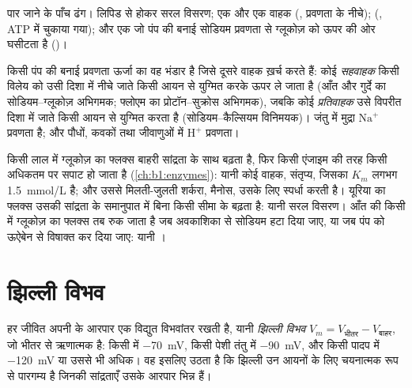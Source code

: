 \begin{omfigure}
{\small पार जाने के पाँच ढंग। लिपिड से होकर सरल विसरण; एक  और एक
वाहक (, प्रवणता के नीचे);  (, ATP में चुकाया गया); और एक  जो पंप की बनाई सोडियम
प्रवणता से ग्लूकोज़ को ऊपर की ओर घसीटता है ()।}
\end{omfigure}

\begin{proposition}[द्वितीयक सक्रिय अभिगमन]\label{prop:b1:membranes-transport:secondary}
किसी पंप की बनाई प्रवणता ऊर्जा का वह भंडार है जिसे दूसरे वाहक ख़र्च करते
हैं: कोई \emph{सहवाहक} किसी विलेय को उसी दिशा में नीचे
जाते किसी आयन से युग्मित करके ऊपर ले जाता है (आँत और गुर्दे का
सोडियम--ग्लूकोज़ अभिगमक; फ्लोएम का प्रोटॉन--सुक्रोस अभिगमक), जबकि कोई
\emph{प्रतिवाहक} उसे विपरीत दिशा में जाते किसी आयन से
युग्मित करता है (सोडियम--कैल्सियम विनिमयक)। जंतु  में मुद्रा
$\mathrm{Na^+}$ प्रवणता है; और पौधों, कवकों तथा जीवाणुओं में
$\mathrm{H^+}$ प्रवणता।
\end{proposition}

\begin{example}[बलगतिकी क्रियाविधि बता देती है]\label{ex:b1:membranes-transport:kinetics}
किसी लाल  में ग्लूकोज़ का फ्लक्स बाहरी सांद्रता के साथ बढ़ता है,
फिर किसी एंजाइम की तरह किसी अधिकतम पर सपाट हो जाता है
(\cref{ch:b1:enzymes}): यानी कोई वाहक, संतृप्य, जिसका $K_m$ लगभग
\qty{1.5}{mmol/L} है; और उससे मिलती-जुलती शर्करा, मैनोस, उसके लिए
स्पर्धा करती है। यूरिया का फ्लक्स उसकी सांद्रता के समानुपात में बिना
किसी सीमा के बढ़ता है: यानी सरल विसरण। आँत की किसी  में ग्लूकोज़
का फ्लक्स तब रुक जाता है जब अवकाशिका से सोडियम हटा दिया जाए, या जब पंप
को ऊऐबेन से विषाक्त कर दिया जाए: यानी ।
\end{example}

\section{झिल्ली विभव}

\begin{definition}[झिल्ली विभव]\label{def:b1:membranes-transport:potential}
हर जीवित  अपनी  के आरपार एक विद्युत विभवांतर रखती
है, यानी \emph{झिल्ली विभव} $V_m = V_{\text{भीतर}} - V_{\text{बाहर}}$, जो भीतर से ऋणात्मक है:
किसी  में \qty{-70}{mV}, किसी पेशी तंतु में \qty{-90}{mV}, और
किसी पादप  में \qty{-120}{mV} या उससे भी अधिक। वह इसलिए उठता है कि
झिल्ली उन आयनों के लिए चयनात्मक रूप से पारगम्य है जिनकी सांद्रताएँ उसके
आरपार भिन्न हैं।
\end{definition}

